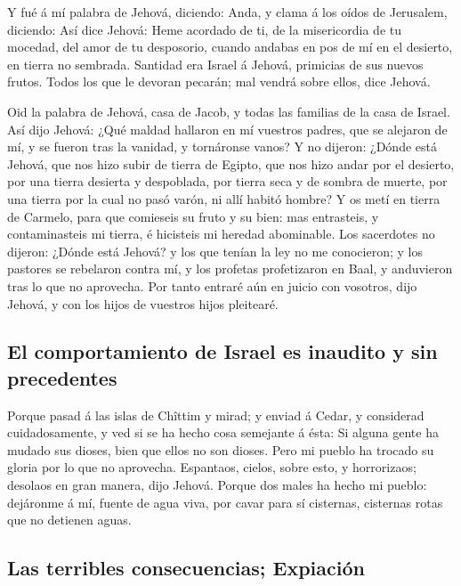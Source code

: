  Y fué á mí palabra de Jehová, diciendo: 
Anda, y clama á los oídos de Jerusalem, diciendo: Así dice Jehová: Heme
acordado de ti, de la misericordia de tu mocedad, del amor de tu
desposorio, cuando andabas en pos de mí en el desierto, en tierra no
sembrada.  Santidad era Israel á Jehová, primicias de sus
nuevos frutos. Todos los que le devoran pecarán; mal vendrá sobre ellos,
dice Jehová.

 Oid la palabra de Jehová, casa de Jacob, y todas las
familias de la casa de Israel.  Así dijo Jehová: ¿Qué
maldad hallaron en mí vuestros padres, que se alejaron de mí, y se
fueron tras la vanidad, y tornáronse vanos?  Y no dijeron:
¿Dónde está Jehová, que nos hizo subir de tierra de Egipto, que nos hizo
andar por el desierto, por una tierra desierta y despoblada, por tierra
seca y de sombra de muerte, por una tierra por la cual no pasó varón, ni
allí habitó hombre?  Y os metí en tierra de Carmelo, para
que comieseis su fruto y su bien: mas entrasteis, y contaminasteis mi
tierra, é hicisteis mi heredad abominable.  Los sacerdotes
no dijeron: ¿Dónde está Jehová? y los que tenían la ley no me
conocieron; y los pastores se rebelaron contra mí, y los profetas
profetizaron en Baal, y anduvieron tras lo que no aprovecha.
 Por tanto entraré aún en juicio con vosotros, dijo
Jehová, y con los hijos de vuestros hijos pleitearé.

\hypertarget{el-comportamiento-de-israel-es-inaudito-y-sin-precedentes}{%
\subsection{El comportamiento de Israel es inaudito y sin
precedentes}\label{el-comportamiento-de-israel-es-inaudito-y-sin-precedentes}}

 Porque pasad á las islas de Chîttim y mirad; y enviad á
Cedar, y considerad cuidadosamente, y ved si se ha hecho cosa semejante
á ésta:  Si alguna gente ha mudado sus dioses, bien que
ellos no son dioses. Pero mi pueblo ha trocado su gloria por lo que no
aprovecha.  Espantaos, cielos, sobre esto, y horrorizaos;
desolaos en gran manera, dijo Jehová.  Porque dos males
ha hecho mi pueblo: dejáronme á mí, fuente de agua viva, por cavar para
sí cisternas, cisternas rotas que no detienen aguas.

\hypertarget{las-terribles-consecuencias-expiaciuxf3n}{%
\subsection{Las terribles consecuencias;
Expiación}\label{las-terribles-consecuencias-expiaciuxf3n}}

